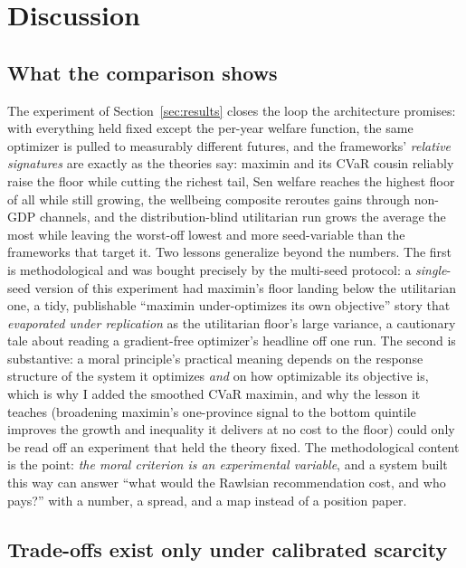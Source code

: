 \documentclass[11pt,a4paper]{article}
\begin{document}
\section{Discussion}
\label{sec:discussion}

\subsection{What the comparison shows}

The experiment of Section~\ref{sec:results} closes the loop the architecture
promises: with everything held fixed except the per-year welfare function, the
same optimizer is pulled to measurably different futures, and the frameworks'
\emph{relative signatures} are exactly as the theories say: maximin and its
CVaR cousin reliably raise the floor while cutting the richest tail, Sen
welfare reaches the highest floor of all while still growing, the wellbeing
composite reroutes gains through non-GDP channels, and the distribution-blind
utilitarian run grows the average the most while leaving the worst-off lowest
and more seed-variable than the frameworks that target it. Two lessons
generalize beyond the numbers. The first is methodological and was bought
precisely by the multi-seed protocol: a \emph{single}-seed version of this
experiment had maximin's floor landing below the utilitarian one, a tidy,
publishable ``maximin under-optimizes its own objective'' story that
\emph{evaporated under replication} as the utilitarian floor's large variance,
a cautionary tale about reading a gradient-free optimizer's headline off one
run. The second is substantive: a moral principle's practical meaning depends
on the response structure of the system it optimizes \emph{and} on how
optimizable its objective is, which is why I added the smoothed CVaR
maximin, and why the lesson it teaches (broadening maximin's one-province
signal to the bottom quintile improves the growth and inequality it delivers at
no cost to the floor) could only be read off an experiment that held the
theory fixed. The methodological content is the point: \emph{the moral
criterion is an experimental variable}, and a system built this way can answer
``what would the Rawlsian recommendation cost, and who pays?'' with a number, a
spread, and a map instead of a position paper.

\subsection{Trade-offs exist only under calibrated scarcity}
\end{document}

